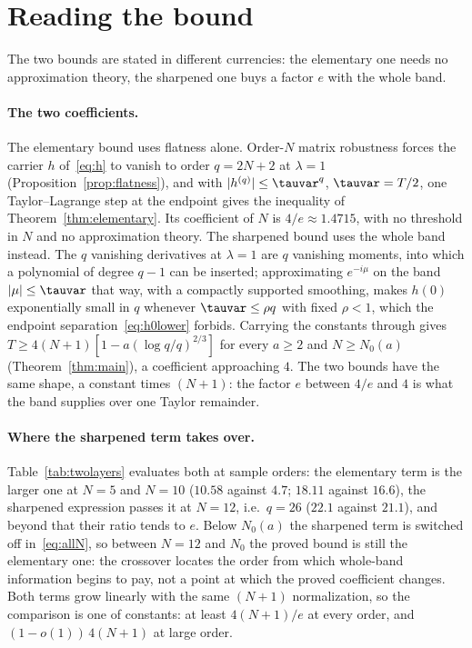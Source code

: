 \section{Reading the bound}
\label{sec:reading}

The two bounds are stated in different currencies: the elementary one needs no approximation theory, the sharpened one buys a factor $e$ with the whole band.

\paragraph{The two coefficients.} The elementary bound uses flatness alone. Order-$N$
matrix robustness forces the carrier $h$ of~\eqref{eq:h} to vanish to order $q=2N+2$ at
$\lambda=1$ (Proposition~\ref{prop:flatness}), and with $|h^{(q)}|\le\tauvar^{q}$,
$\tauvar=T/2$, one Taylor--Lagrange step at the endpoint gives the inequality of
Theorem~\ref{thm:elementary}. Its coefficient of $N$ is $4/e\approx1.4715$, with no
threshold in $N$ and no approximation theory. The sharpened bound uses the
whole band instead. The $q$ vanishing derivatives at $\lambda=1$ are $q$ vanishing
moments, into which a polynomial of degree $q-1$ can be inserted; approximating
$e^{-i\mu}$ on the band $|\mu|\le\tauvar$ that way, with a compactly supported smoothing,
makes $h(0)$ exponentially small in $q$ whenever $\tauvar\le\rho q$ with fixed $\rho<1$,
which the endpoint separation~\eqref{eq:h0lower} forbids. Carrying the constants through
gives $T\ge4(N+1)[1-a(\log q/q)^{2/3}]$ for every $a\ge2$ and $N\ge N_0(a)$
(Theorem~\ref{thm:main}), a coefficient approaching $4$. The two bounds have the same
shape, a constant times $(N+1)$: the factor $e$ between $4/e$ and $4$ is what the band
supplies over one Taylor remainder.

\paragraph{Where the sharpened term takes over.} Table~\ref{tab:twolayers} evaluates both
at sample orders: the elementary term is the larger one at $N=5$ and $N=10$ ($10.58$
against $4.7$; $18.11$ against $16.6$), the sharpened expression passes it at $N=12$,
i.e.\ $q=26$ ($22.1$ against $21.1$), and beyond that their ratio tends to $e$. Below
$N_0(a)$ the sharpened term is switched off in~\eqref{eq:allN}, so between $N=12$ and
$N_0$ the proved bound is still the elementary one: the crossover locates the order from
which whole-band information begins to pay, not a point at which the proved coefficient
changes. Both terms grow linearly with the same $(N+1)$ normalization, so the comparison
is one of constants: at least $4(N+1)/e$ at every order, and $(1-o(1))\,4(N+1)$ at
large order.


